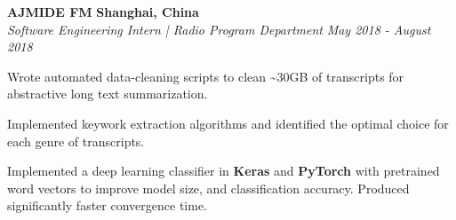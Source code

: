 \headerrow
    {\textbf{AJMIDE FM}}
    {\textbf{Shanghai, China}}
\\
\headerrow
    {\emph{Software Engineering Intern | Radio Program Department}}
    {\emph{May 2018 - August 2018}}
    
\begin{itemize*}
    \item Wrote automated data-cleaning scripts to clean \textasciitilde30GB of transcripts for abstractive long text summarization. 
    \item Implemented keywork extraction algorithms and identified the optimal choice for each genre of transcripts. 
    \item Implemented a deep learning classifier in \textbf{Keras} and \textbf{PyTorch} with pretrained word vectors to improve model size,
        and classification accuracy. Produced significantly faster convergence time. 
\end{itemize*}